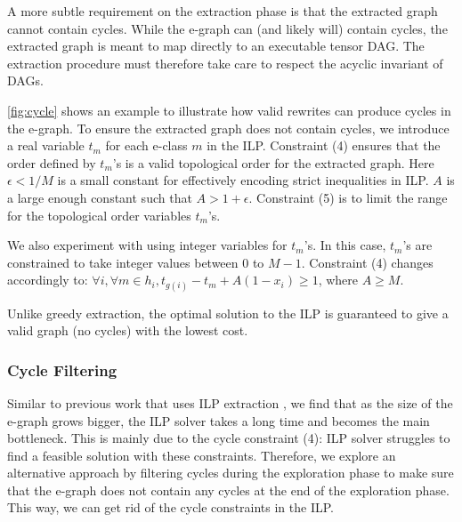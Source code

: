 A more subtle requirement on the extraction phase is that the extracted graph cannot contain cycles.
While the e-graph can (and likely will) contain cycles, the extracted graph is meant to map directly to an executable tensor DAG.
The extraction procedure must therefore take care to respect the acyclic invariant of DAGs.

\autoref{fig:cycle} shows an example to illustrate how valid rewrites can produce cycles in the e-graph.
To ensure the extracted graph does not contain cycles, we introduce a real variable $t_m$ for each e-class $m$ in the ILP.
Constraint (4) ensures that the order defined by $t_m$'s is a valid topological order for the extracted graph.
Here $\epsilon < 1/M$ is a small constant for effectively encoding strict inequalities in ILP.
$A$ is a large enough constant such that $A > 1 + \epsilon$.
Constraint (5) is to limit the range for the topological order variables $t_m$'s.

We also experiment with using integer variables for $t_m$'s. In this case, $t_m$'s are constrained to take integer values between 0 to $M-1$.
Constraint (4) changes accordingly to: $\forall i, \forall m \in h_i, t_{g(i)} - t_m + A (1 - x_i) \geq 1$, where $A \geq M$.

Unlike greedy extraction, the optimal solution to the ILP is guaranteed to give a valid graph (no cycles) with the lowest cost.


\subsubsection{Cycle Filtering}
\label{sec:cycle}

Similar to previous work that uses ILP extraction \cite{eqsat, spores},
we find that as the size of the e-graph grows bigger, the ILP solver takes a long time and becomes the main bottleneck.
This is mainly due to the cycle constraint (4): ILP solver struggles to find a feasible solution with these constraints.
Therefore, we explore an alternative approach by filtering cycles during the exploration phase to make sure that the e-graph does not contain any cycles at the end of the exploration phase.
This way, we can get rid of the cycle constraints in the ILP.

